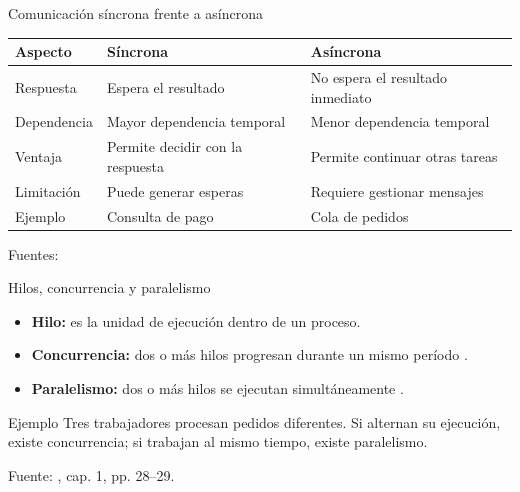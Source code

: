 \begin{frame}{Comunicación síncrona frente a asíncrona}
  \small
  \begin{table}
    \centering
    \begin{tabularx}{\textwidth}{lXX}
      \toprule
      \textbf{Aspecto} & \textbf{Síncrona} & \textbf{Asíncrona} \\
      \midrule
      Respuesta & Espera el resultado & No espera el resultado inmediato \\
      Dependencia & Mayor dependencia temporal & Menor dependencia temporal \\
      Ventaja & Permite decidir con la respuesta & Permite continuar otras tareas \\
      Limitación & Puede generar esperas & Requiere gestionar mensajes \\
      Ejemplo & Consulta de pago & Cola de pedidos \\
      \bottomrule
    \end{tabularx}
  \end{table}

  \vspace{0.3cm}
  {\tiny Fuentes: \cite{kazanavicius2023,maharjan2023,derlatka2023}}
\end{frame}

\begin{frame}{Hilos, concurrencia y paralelismo}
  \begin{itemize}
    \item \textbf{Hilo:} es la unidad de ejecución dentro de un proceso.
    \item \textbf{Concurrencia:} dos o más hilos progresan durante un mismo período \cite{reinders2023}.
    \item \textbf{Paralelismo:} dos o más hilos se ejecutan simultáneamente \cite{reinders2023}.
  \end{itemize}

  \vspace{0.3cm}
  \begin{block}{Ejemplo}
    Tres trabajadores procesan pedidos diferentes. Si alternan su ejecución, existe concurrencia; si trabajan al mismo tiempo, existe paralelismo.
  \end{block}

  {\tiny Fuente: \cite{reinders2023}, cap. 1, pp. 28--29.}
\end{frame}


